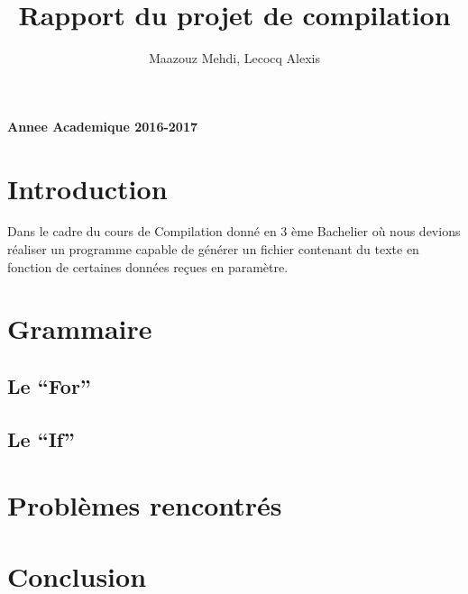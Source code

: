 \documentclass[a4paper,10pt]{article}
\title{Rapport du projet de compilation}
\author{Maazouz Mehdi, Lecocq Alexis}
\begin{document}
\maketitle
\textbf{Annee Academique 2016-2017}\\
\tableofcontents
\newpage

\section{Introduction}
Dans le cadre du cours de Compilation donné en 3 ème Bachelier où nous devions réaliser un programme
capable de générer un fichier contenant du texte en fonction de certaines données reçues en paramètre.
\section{Grammaire}
\subsection{Le ``For''}
\subsection{Le ``If''}
\section{Problèmes rencontrés}
\section{Conclusion}
\end{document}
